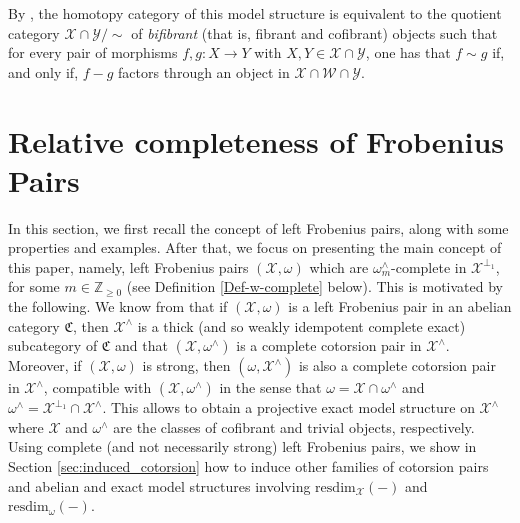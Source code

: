 \documentclass[10pt,reqno]{amsart}
\numberwithin{equation}{section}
\theoremstyle{remark}
\newcommand{\X}{\mathcal{X}}
\newcommand{\resdim}{\mathrm{resdim}}
\begin{document}
By \cite[Thm. 2.6 (i)]{GillespieHereditary}, the homotopy category of this model structure is equivalent to the quotient category $\mathcal{X} \cap \mathcal{Y} / \sim$ of \emph{bifibrant} (that is, fibrant and cofibrant) objects such that for every pair of morphisms $f, g \colon X \to Y$ with $X, Y \in \mathcal{X} \cap \mathcal{Y}$, one has that $f \sim g$ if, and only if, $f - g$ factors through an object in $\mathcal{X} \cap \mathcal{W} \cap \mathcal{Y}$. 


\section{Relative completeness of Frobenius Pairs} \label{sec:completeness}

In this section, we first recall the concept of left Frobenius pairs, along with some properties and examples. After that, we focus on presenting the main concept of this paper, namely, left Frobenius pairs $(\X,\omega)$ which are $\omega^\wedge_m$-complete in $\X^{\perp_1}$, for some $m \in \mathbb{Z}_{\geq 0}$  (see Definition \ref{Def-w-complete} below). This is motivated by the following. We know from \cite[Thms. 2.11 \& 3.6]{BMSP} that if $(\X,\omega)$ is a left Frobenius pair in an abelian category $\mathfrak{C}$, then $\X^\wedge$ is a thick (and so weakly idempotent complete exact) subcategory of $\mathfrak{C}$ and that $(\X,\omega^\wedge)$ is a complete cotorsion pair in $\X^\wedge$. Moreover, if $(\X,\omega)$ is strong, then $(\omega,\X^\wedge)$ is also a complete cotorsion pair in $\X^\wedge$, compatible with $(\X,\omega^\wedge)$ in the sense that $\omega = \X \cap \omega^\wedge$ and $\omega^\wedge = \X^{\perp_1} \cap \X^\wedge$. This allows to obtain a projective exact model structure on $\X^\wedge$ where $\X$ and $\omega^\wedge$ are the classes of cofibrant and trivial objects, respectively. Using complete (and not necessarily strong) left Frobenius pairs, we show in Section \ref{sec:induced_cotorsion} how to induce other families of cotorsion pairs and abelian and exact model structures involving $\resdim_{\X}(-)$ and $\resdim_{\omega}(-)$. 
\end{document}
